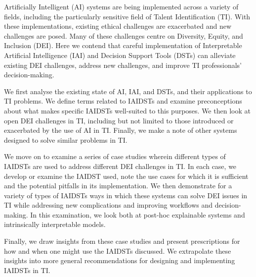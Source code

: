Artificially Intelligent (AI) systems are being implemented across a variety of fields, including the particularly sensitive field of Talent Identification (TI). With these implementations, existing ethical challenges are exacerbated and new challenges are posed. Many of these challenges centre on Diversity, Equity, and Inclusion (DEI). Here we contend that careful implementation of Interpretable Artificial Intelligence (IAI) and Decision Support Tools (DSTs) can alleviate existing DEI challenges, address new challenges, and improve TI professionals' decision-making.

We first analyse the existing state of AI, IAI, and DSTs, and their applications to TI problems. We define terms related to IAIDSTs and examine preconceptions about what makes specific IAIDSTs well-suited to this purposes. We then look at open DEI challenges in TI, including but not limited to those introduced or exacerbated by the use of AI in TI. Finally, we make a note of other systems designed to solve similar problems in TI.

We move on to examine a series of case studies wherein different types of IAIDSTs are used to address different DEI challenges in TI. In each case, we develop or examine the IAIDST used, note the use cases for which it is sufficient and the potential pitfalls in its implementation. We then demonstrate for a variety of types of IAIDSTs ways in which these systems can solve DEI issues in TI while addressing new complications and improving workflows and decision-making. In this examination, we look both at post-hoc explainable systems and intrinsically interpretable models.

Finally, we draw insights from these case studies and present prescriptions for how and when one might use the IAIDSTs discussed. We extrapolate these insights into more general recommendations for designing and implementing IAIDSTs in TI.

